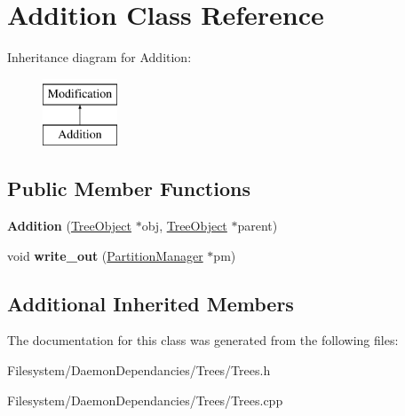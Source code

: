 \hypertarget{classAddition}{}\section{Addition Class Reference}
\label{classAddition}
Inheritance diagram for Addition\+:\begin{figure}[H]
\begin{center}
\leavevmode
\includegraphics[height=2.000000cm]{classAddition}
\end{center}
\end{figure}
\subsection*{Public Member Functions}
\begin{DoxyCompactItemize}
\item 
{\bfseries Addition} (\hyperlink{classTreeObject}{Tree\+Object} $\ast$obj, \hyperlink{classTreeObject}{Tree\+Object} $\ast$parent)\hypertarget{classAddition_a0bcd6cd605c0e90a834339a1feb20901}{}\label{classAddition_a0bcd6cd605c0e90a834339a1feb20901}

\item 
void {\bfseries write\+\_\+out} (\hyperlink{classPartitionManager}{Partition\+Manager} $\ast$pm)\hypertarget{classAddition_a08cd2dae96a62c80d6fe62339232fbca}{}\label{classAddition_a08cd2dae96a62c80d6fe62339232fbca}

\end{DoxyCompactItemize}
\subsection*{Additional Inherited Members}


The documentation for this class was generated from the following files\+:\begin{DoxyCompactItemize}
\item 
Filesystem/\+Daemon\+Dependancies/\+Trees/Trees.\+h\item 
Filesystem/\+Daemon\+Dependancies/\+Trees/Trees.\+cpp\end{DoxyCompactItemize}
